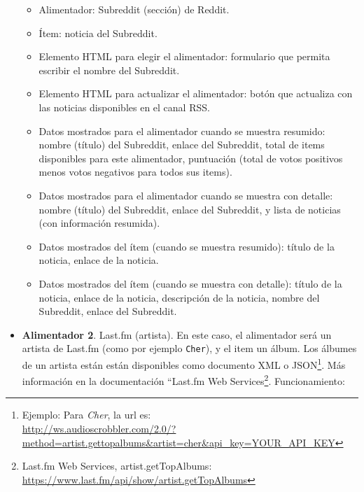 \begin{itemize}
  \begin{itemize}
  \item Alimentador: Subreddit (sección) de Reddit.
  \item Ítem: noticia del Subreddit.
  \item Elemento HTML para elegir el alimentador: formulario que permita escribir el nombre del Subreddit.
  \item Elemento HTML para actualizar el alimentador: botón que actualiza con las noticias disponibles en el canal RSS.
  \item Datos mostrados para el alimentador cuando se muestra resumido: nombre (título) del Subreddit, enlace del Subreddit, total de items disponibles para este alimentador, puntuación (total de votos positivos menos votos negativos para todos sus items).
  \item Datos mostrados para el alimentador cuando se muestra con detalle: nombre (título) del Subreddit, enlace del Subreddit, y lista de noticias (con información resumida).
  \item Datos mostrados del ítem (cuando se muestra resumido): título de la noticia, enlace de la noticia.
  \item Datos mostrados del ítem (cuando se muestra con detalle): título de la noticia, enlace de la noticia, descripción de la noticia, nombre del Subreddit, enlace del Subreddit.
  \end{itemize}

\item \textbf{Alimentador 2}. Last.fm (artista). En este caso, el alimentador será un artista de Last.fm (como por ejemplo \verb|Cher|), y el item un álbum. Los álbumes de un artista están están disponibles como documento XML o JSON\footnote{Ejemplo: Para \emph{Cher}, la url es:\\ \url{http://ws.audioscrobbler.com/2.0/?method=artist.gettopalbums&artist=cher&api_key=YOUR_API_KEY}}. Más información en la documentación ``Last.fm Web Services\footnote{Last.fm Web Services, artist.getTopAlbums: \\ \url{https://www.last.fm/api/show/artist.getTopAlbums}}. Funcionamiento:


\end{itemize}
